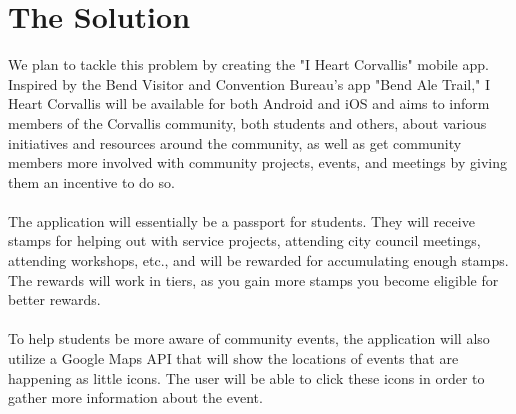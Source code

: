 \documentclass[draftclsnofoot, onecolumn, 10pt, compsoc]{IEEEtran}
\begin{document}
	\section{The Solution}
		We plan to tackle this problem by creating the "I Heart Corvallis" mobile app. Inspired by the Bend Visitor and 
		Convention Bureau's app "Bend Ale Trail," I Heart Corvallis will be available for both Android and iOS and aims to 
		inform members of the Corvallis community, both students and others, about various initiatives and resources around 
		the community, as well as get community members more involved with community projects, events, and meetings by 
		giving them an incentive to do so. \\ \\ 
		The application will essentially be a passport for students. They will receive stamps for helping out with service 
		projects, attending city council meetings, attending workshops, etc., and will be rewarded for accumulating enough 
		stamps. The rewards will work in tiers, as you gain more stamps you become eligible for better rewards. \\ \\
		To help students be more aware of community events, the application will also utilize a Google Maps API that will 
		show the locations of events that are happening as little icons. The user will be able to click these icons in order to 
		gather more information about the event.
	
\end{document}
